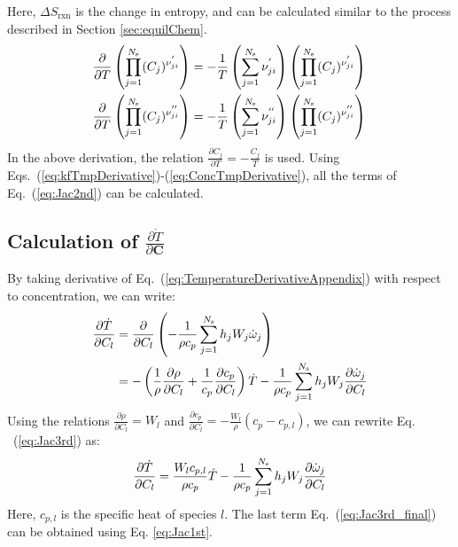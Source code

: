 Here, $\Delta S_{\mathrm{rxn}}$ is the change in entropy, and can be calculated similar to the process described in Section \ref{sec:equilChem}.
\begin{equation}\label{eq:ConcTmpDerivative}
\begin{aligned}
\frac{\partial}{\partial T} \left( \prod_{j=1}^{N_{\rm s}} (C_j)^{{\nu}_{ji}^{'}}  \right) &= - \frac{1}{T} \left(  \sum_{j=1}^{N_{\rm s}} {\nu}_{ji}^{'} \right) \left(  \prod_{j=1}^{N_{\rm s}} (C_j)^{{\nu}_{ji}^{'}}  \right) \\
\frac{\partial}{\partial T} \left( \prod_{j=1}^{N_{\rm s}} (C_j)^{{\nu}_{ji}^{''}}  \right) &= - \frac{1}{T} \left(  \sum_{j=1}^{N_{\rm s}} {\nu}_{ji}^{''} \right) \left(  \prod_{j=1}^{N_{\rm s}} (C_j)^{{\nu}_{ji}^{''}}  \right){}
\end{aligned}
\end{equation}
In the above derivation, the relation $\frac{\partial C_j}{\partial T} = - \frac{C_j}{T}$ is used.
Using Eqs.~(\ref{eq:kfTmpDerivative})-(\ref{eq:ConcTmpDerivative}), all the terms of Eq.~(\ref{eq:Jac2nd}) can be calculated.


\subsection*{Calculation of $\frac{\partial \dot{T}}{\partial \mathbf{C}}$}
By taking derivative of Eq.~(\ref{eq:TemperatureDerivativeAppendix}) with respect to concentration, we can write:
\begin{equation} \label{eq:Jac3rd}
\begin{aligned}
\frac{\partial \dot{T}}{\partial C_l} &= \frac{\partial}{\partial C_l} \left( -\frac{1}{\rho c_p} \sum_{j=1}^{N_{\rm s}}h_j W_j \dot{\omega}_j  \right) \\
&= -\left( \frac{1}{\rho} \frac{\partial \rho}{\partial C_l} +  \frac{1}{c_p} \frac{\partial c_p}{\partial C_l} \right) \dot{T} - \frac{1}{{\rho} c_p} \sum_{j=1}^{N_{\rm s}}h_j W_j \frac{\partial \dot{\omega}_j}{\partial C_l}
\end{aligned}
\end{equation}
Using the relations $\frac{\partial \rho}{\partial C_l} = W_l$ and $\frac{\partial c_p}{\partial C_l} = - \frac{W_l}{\rho}\left( c_p -c_{p,l} \right)$, we can rewrite Eq. ~(\ref{eq:Jac3rd}) as:
\begin{equation} \label{eq:Jac3rd_final}
\frac{\partial \dot{T}}{\partial C_l} = \frac{W_l c_{p,l}}{\rho c_p} \dot{T} - \frac{1}{{\rho} c_p} \sum_{j=1}^{N_{\rm s}}h_j W_j \frac{\partial \dot{\omega}_j}{\partial C_l}
\end{equation}
Here, $c_{p,l}$ is the specific heat of species $l$. The last term Eq.~(\ref{eq:Jac3rd_final}) can be obtained using Eq. \ref{eq:Jac1st}.

